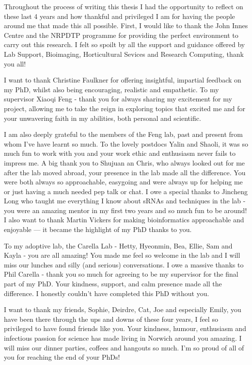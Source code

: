 
\begin{acknowledgements}      

Throughout the process of writing this thesis I had the opportunity to reflect on these last 4 years and how thankful and privileged I am for having the people around me that made this all possible. First, I would like to thank the John Innes Centre and the NRPDTP programme for providing the perfect environment to carry out this research. I felt so spoilt by all the support and guidance offered by Lab Support, Bioimaging, Horticultural Sevices and Research Computing, thank you all!

I want to thank Christine Faulkner for offering insightful, impartial feedback on my PhD, whilst also being encouraging, realistic and empathetic. To my supervisor Xiaoqi Feng - thank you for always sharing my excitement for my project, allowing me to take the reign in exploring topics that excited me and for your unwavering faith in my abilities, both personal and scientific. 

I am also deeply grateful to the members of the Feng lab, past and present from whom I've have learnt so much. To the lovely postdocs Yalin and Shaoli, it was so much fun to work with you and your work ethic and enthusiasm never fails to impress me. A big thank you to Shujuan an Chris, who always looked out for me after the lab moved abroad, your presence in the lab made all the difference. You were both always so approachable, easygoing and were always up for helping me or just having a much needed pep talk or chat. I owe a special thanks to Jincheng Long who taught me everything I know about sRNAs and techniques in the lab - you were an amazing mentor in my first two years and so much fun to be around!  I also want to thank Martin Vickers for making bioinformatics approachable and enjoyable — it became the highlight of my PhD thanks to you.

To my adoptive lab, the Carella Lab -  Hetty, Hyeonmin, Bea, Ellie, Sam and Kayla - you are all amazing! You made me feel so welcome in the lab and I will miss our lunches and silly (and serious) conversations. I owe a massive thanks to Phil Carella - thank you so much for agreeing to be my supervisor for the final part of my PhD. Your kindness, support, and calm presence made all the difference. I honestly couldn’t have completed this PhD without you.

I want to thank my friends, Sophie, Deirdre, Cat, Joe and especially Emily, you have been there through the ups and downs of these four years, I feel so privileged to have found friends like you. Your kindness, humour, enthusiasm and infectious passion for science has made living in Norwich around you amazing. I will miss our dinner parties, coffees and hangouts so much. I’m so proud of all of you for reaching the end of your PhDs!


\end{acknowledgements}
